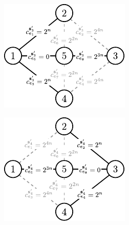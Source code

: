 \begin{figure}[!htbp]
	\null\hfill
	\begin{subfigure}[b]{0.3\textwidth}
		\includegraphics[width=\textwidth]{Chapter_II/MIN-MAX-REG3-example/a}
		\caption{}
		\label{fig:minmaxregexample3:a}
	\end{subfigure}
	\hfill
	\begin{subfigure}[b]{0.3\textwidth}
		\includegraphics[width=\textwidth]{Chapter_II/MIN-MAX-REG3-example/b}
		\caption{}

\end{subfigure}
\end{figure}
